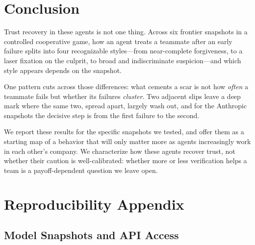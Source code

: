 \documentclass{article}
\begin{document}
\section{Conclusion}
\label{sec:conclusion}

Trust recovery in these agents is not one thing. Across six frontier snapshots in a controlled cooperative game, how an agent treats a teammate after an early failure splits into four recognizable styles---from near-complete forgiveness, to a laser fixation on the culprit, to broad and indiscriminate suspicion---and which style appears depends on the snapshot.

One pattern cuts across those differences: what cements a scar is not how \emph{often} a teammate fails but whether its failures \emph{cluster}. Two adjacent slips leave a deep mark where the same two, spread apart, largely wash out, and for the Anthropic snapshots the decisive step is from the first failure to the second.

We report these results for the specific snapshots we tested, and offer them as a starting map of a behavior that will only matter more as agents increasingly work in each other's company. We characterize how these agents recover trust, not whether their caution is well-calibrated: whether more or less verification helps a team is a payoff-dependent question we leave open.




\appendix

\section{Reproducibility Appendix}
\label{sec:appx-repro}

\subsection{Model Snapshots and API Access}
\end{document}
